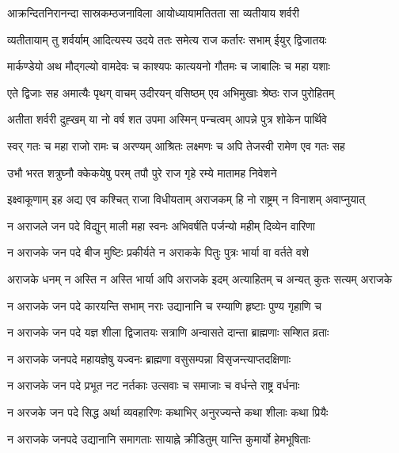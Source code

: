 
\twolineshloka
{आक्रन्दितनिरानन्दा सास्रकम्ठजनाविला}
{आयोध्यायामतितता सा व्यतीयाय शर्वरी} %

\twolineshloka
{व्यतीतायाम् तु शर्वर्याम् आदित्यस्य उदये ततः}
{समेत्य राज कर्तारः सभाम् ईयुर् द्विजातयः} %

\twolineshloka
{मार्कण्डेयो अथ मौद्गल्यो वामदेवः च काश्यपः}
{कात्ययनो गौतमः च जाबालिः च महा यशाः} %

\twolineshloka
{एते द्विजाः सह अमात्यैः पृथग् वाचम् उदीरयन्}
{वसिष्ठम् एव अभिमुखाः श्रेष्ठः राज पुरोहितम्} %

\twolineshloka
{अतीता शर्वरी दुह्खम् या नो वर्ष शत उपमा}
{अस्मिन् पन्चत्वम् आपन्ने पुत्र शोकेन पार्थिवे} %

\twolineshloka
{स्वर् गतः च महा राजो रामः च अरण्यम् आश्रितः}
{लक्ष्मणः च अपि तेजस्वी रामेण एव गतः सह} %

\twolineshloka
{उभौ भरत शत्रुघ्नौ क्केकयेषु परम् तपौ}
{पुरे राज गृहे रम्ये मातामह निवेशने} %

\twolineshloka
{इक्ष्वाकूणाम् इह अद्य एव कश्चित् राजा विधीयताम्}
{अराजकम् हि नो राष्ट्रम् न विनाशम् अवाप्नुयात्} %

\twolineshloka
{न अराजले जन पदे विद्युन् माली महा स्वनः}
{अभिवर्षति पर्जन्यो महीम् दिव्येन वारिणा} %

\twolineshloka
{न अराजके जन पदे बीज मुष्टिः प्रकीर्यते}
{न अराकके पितुः पुत्रः भार्या वा वर्तते वशे} %

\twolineshloka
{अराजके धनम् न अस्ति न अस्ति भार्या अपि अराजके}
{इदम् अत्याहितम् च अन्यत् कुतः सत्यम् अराजके} %

\twolineshloka
{न अराजके जन पदे कारयन्ति सभाम् नराः}
{उद्यानानि च रम्याणि हृष्टाः पुण्य गृहाणि च} %

\twolineshloka
{न अराजके जन पदे यज्ञ शीला द्विजातयः}
{सत्राणि अन्वासते दान्ता ब्राह्मणाः सम्शित व्रताः} %

\twolineshloka
{न अराजके जनपदे महायज्ञेषु यज्वनः}
{ब्राह्मणा वसुसम्पन्ना विसृजन्त्याप्तदक्षिणाः} %

\twolineshloka
{न अराजके जन पदे प्रभूत नट नर्तकाः}
{उत्सवाः च समाजाः च वर्धन्ते राष्ट्र वर्धनाः} %

\twolineshloka
{न अरजके जन पदे सिद्ध अर्था व्यवहारिणः}
{कथाभिर् अनुरज्यन्ते कथा शीलाः कथा प्रियैः} %

\twolineshloka
{न अराजके जनपदे उद्यानानि समागताः}
{सायाह्ने क्रीडितुम् यान्ति कुमार्यो हेमभूषिताः} %

